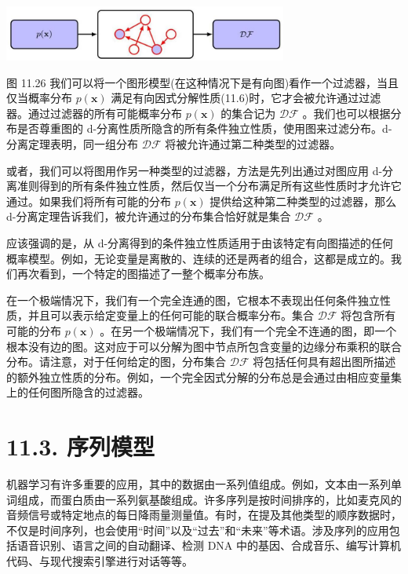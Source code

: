 \documentclass[10pt]{report}
\begin{document}
\begin{center}
\includegraphics[max width=0.7\textwidth]{images/0194e279-9b28-703a-88f4-c3ac21e2010d_368_573_345_920_180_0.jpg}
\end{center}
\hspace*{3em} 

图 11.26 我们可以将一个图形模型(在这种情况下是有向图)看作一个过滤器，当且仅当概率分布 \(p\left( \mathbf{x}\right)\) 满足有向因式分解性质(11.6)时，它才会被允许通过过滤器。通过过滤器的所有可能概率分布 \(p\left( \mathbf{x}\right)\) 的集合记为 \(\mathcal{D}\mathcal{F}\) 。我们也可以根据分布是否尊重图的 d-分离性质所隐含的所有条件独立性质，使用图来过滤分布。d-分离定理表明，同一组分布 \(\mathcal{D}\mathcal{F}\) 将被允许通过第二种类型的过滤器。

或者，我们可以将图用作另一种类型的过滤器，方法是先列出通过对图应用 d-分离准则得到的所有条件独立性质，然后仅当一个分布满足所有这些性质时才允许它通过。如果我们将所有可能的分布 \(p\left( \mathbf{x}\right)\) 提供给这种第二种类型的过滤器，那么 d-分离定理告诉我们，被允许通过的分布集合恰好就是集合 \(\mathcal{D}\mathcal{F}\) 。

应该强调的是，从 d-分离得到的条件独立性质适用于由该特定有向图描述的任何概率模型。例如，无论变量是离散的、连续的还是两者的组合，这都是成立的。我们再次看到，一个特定的图描述了一整个概率分布族。

在一个极端情况下，我们有一个完全连通的图，它根本不表现出任何条件独立性质，并且可以表示给定变量上的任何可能的联合概率分布。集合 \(\mathcal{D}\mathcal{F}\) 将包含所有可能的分布 \(p\left( \mathbf{x}\right)\) 。在另一个极端情况下，我们有一个完全不连通的图，即一个根本没有边的图。这对应于可以分解为图中节点所包含变量的边缘分布乘积的联合分布。请注意，对于任何给定的图，分布集合 \(\mathcal{D}\mathcal{F}\) 将包括任何具有超出图所描述的额外独立性质的分布。例如，一个完全因式分解的分布总是会通过由相应变量集上的任何图所隐含的过滤器。

\section*{11.3. 序列模型}

机器学习有许多重要的应用，其中的数据由一系列值组成。例如，文本由一系列单词组成，而蛋白质由一系列氨基酸组成。许多序列是按时间排序的，比如麦克风的音频信号或特定地点的每日降雨量测量值。有时，在提及其他类型的顺序数据时，不仅是时间序列，也会使用“时间”以及“过去”和“未来”等术语。涉及序列的应用包括语音识别、语言之间的自动翻译、检测 DNA 中的基因、合成音乐、编写计算机代码、与现代搜索引擎进行对话等等。
\end{document}
